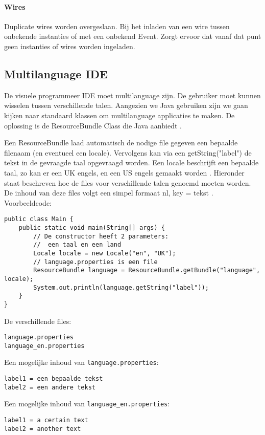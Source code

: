 \documentclass[]{article}
\begin{document}
\paragraph{Wires}
Duplicate wires worden overgeslaan. Bij het inladen van een wire tussen onbekende instanties of met een onbekend Event. Zorgt ervoor dat vanaf dat punt geen instanties of wires worden ingeladen.
\subsection{Multilanguage IDE}
\label{Multilanguage}
De visuele programmeer IDE moet multilanguage zijn. De gebruiker moet kunnen wisselen tussen verschillende talen. Aangezien we Java gebruiken zijn we gaan kijken naar standaard klassen om multilanguage applicaties te maken. De oplossing is de ResourceBundle Class die Java aanbiedt \cite{javabundle}.

Een ResourceBundle laad automatisch de nodige file gegeven een bepaalde filenaam (en eventueel een locale). Vervolgens kan via een getString("label") de tekst in de gevraagde taal opgevraagd worden. Een locale beschrijft een bepaalde taal, zo kan er een UK engels, en een US engels gemaakt worden \cite{javalocale}. Hieronder staat beschreven hoe de files voor verschillende talen genoemd moeten worden. De inhoud van deze files volgt een simpel formaat nl, key = tekst \cite{jenkov}.\\
Voorbeeldcode: \cite{jenkov}
\lstset{language=Java}
\begin{lstlisting}
public class Main {
	public static void main(String[] args) {
		// De constructor heeft 2 parameters:
		//	een taal en een land
		Locale locale = new Locale("en", "UK"); 
		// language.properties is een file
		ResourceBundle language = ResourceBundle.getBundle("language", locale);
		System.out.println(language.getString("label"));
	}
}
\end{lstlisting}
De verschillende files:
\lstset{language=XML}
\begin{lstlisting}
language.properties
language_en.properties
\end{lstlisting}
Een mogelijke inhoud van \texttt{language.properties}: 
\lstset{language=XML}
\begin{lstlisting}
label1 = een bepaalde tekst
label2 = een andere tekst
\end{lstlisting}
Een mogelijke inhoud van \texttt{language\_en.properties}: 
\lstset{language=XML}
\begin{lstlisting}
label1 = a certain text
label2 = another text
\end{lstlisting}
\end{document}
